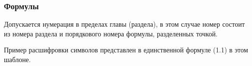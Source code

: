 \subsubsection{Формулы}

Допускается нумерация в пределах главы
(раздела), в этом случае номер состоит из номера раздела и порядкового номера
формулы, разделенных точкой. 


Пример расшифровки символов представлен в единственной формуле (1.1) в этом шаблоне.

